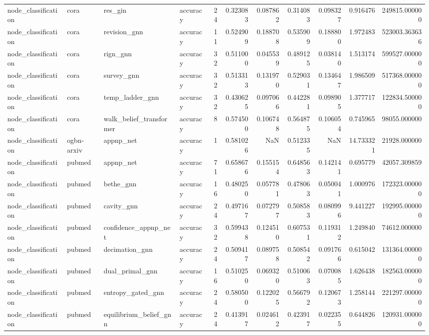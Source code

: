 \begin{tabular}{llllrrrrrrr}
node_classification & cora & res_gin & accuracy & 24 & 0.323083 & 0.087862 & 0.314083 & 0.098327 & 0.916476 & 249815.000000 \\
node_classification & cora & revision_gnn & accuracy & 11 & 0.524909 & 0.188708 & 0.535909 & 0.188800 & 1.972483 & 523003.363636 \\
node_classification & cora & rign_gnn & accuracy & 32 & 0.511000 & 0.045539 & 0.489125 & 0.038140 & 1.513174 & 599527.000000 \\
node_classification & cora & survey_gnn & accuracy & 32 & 0.513313 & 0.131970 & 0.529031 & 0.134647 & 1.986509 & 517368.000000 \\
node_classification & cora & temp_ladder_gnn & accuracy & 32 & 0.430625 & 0.097066 & 0.442281 & 0.098905 & 1.377717 & 122834.500000 \\
node_classification & cora & walk_belief_transformer & accuracy & 8 & 0.574500 & 0.106748 & 0.564875 & 0.106054 & 0.745965 & 98055.000000 \\
node_classification & ogbn-arxiv & appnp_net & accuracy & 1 & 0.581026 & NaN & 0.512335 & NaN & 14.733321 & 21928.000000 \\
node_classification & pubmed & appnp_net & accuracy & 71 & 0.658676 & 0.155154 & 0.648563 & 0.142141 & 0.695779 & 42057.309859 \\
node_classification & pubmed & bethe_gnn & accuracy & 16 & 0.480250 & 0.057781 & 0.478063 & 0.050041 & 1.000976 & 172323.000000 \\
node_classification & pubmed & cavity_gnn & accuracy & 24 & 0.497167 & 0.072797 & 0.508583 & 0.080996 & 9.441227 & 192995.000000 \\
node_classification & pubmed & confidence_appnp_net & accuracy & 32 & 0.599438 & 0.124510 & 0.607531 & 0.119312 & 1.249840 & 74612.000000 \\
node_classification & pubmed & decimation_gnn & accuracy & 24 & 0.509417 & 0.089758 & 0.508542 & 0.091766 & 0.615042 & 131364.000000 \\
node_classification & pubmed & dual_primal_gnn & accuracy & 16 & 0.510250 & 0.069320 & 0.510063 & 0.070085 & 1.626438 & 182563.000000 \\
node_classification & pubmed & entropy_gated_gnn & accuracy & 24 & 0.580500 & 0.122025 & 0.566792 & 0.120673 & 1.258144 & 221297.000000 \\
node_classification & pubmed & equilibrium_belief_gnn & accuracy & 24 & 0.413917 & 0.024612 & 0.423917 & 0.022355 & 0.644826 & 120931.000000 \\

\end{tabular}
